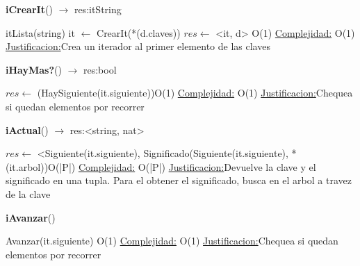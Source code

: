 \begin{Algoritmos}

\begin{algorithm}[H]{\textbf{iCrearIt}() $\to$ res:itString}
	\begin{algorithmic}[1]
		\State itLista(string) it $\gets$ CrearIt(*(d.claves))
		\State $res \gets$ <it, d> \Comment O(1)
		\medskip
		\Statex \underline{Complejidad:} O(1)
			\Statex \underline{Justificacion:}Crea un iterador al primer elemento de las claves
	\end{algorithmic}
\end{algorithm}


\begin{algorithm}[H]{\textbf{iHayMas?}() $\to$ res:bool}
	\begin{algorithmic}[1]
		\State $res \gets$ (HaySiguiente(it.siguiente))\Comment O(1)
		\medskip
		\Statex \underline{Complejidad:} O(1)
			\Statex \underline{Justificacion:}Chequea si quedan elementos por recorrer
	\end{algorithmic}
\end{algorithm}


\begin{algorithm}[H]{\textbf{iActual}() $\to$ res:<string, nat>}
	\begin{algorithmic}[1]
		\State $res \gets$ <Siguiente(it.siguiente), Significado(Siguiente(it.siguiente), *(it.arbol))\Comment O(|P|)
		\medskip
		\Statex \underline{Complejidad:} O(|P|)
			\Statex \underline{Justificacion:}Devuelve la clave y el significado en una tupla. Para el obtener el significado, busca en el arbol a travez de la clave
	\end{algorithmic}
\end{algorithm}

\begin{algorithm}[H]{\textbf{iAvanzar}()}
	\begin{algorithmic}[1]
		\State Avanzar(it.siguiente) \Comment O(1)
		\medskip
		\Statex \underline{Complejidad:} O(1)
			\Statex \underline{Justificacion:}Chequea si quedan elementos por recorrer
	\end{algorithmic}
\end{algorithm}


\end{Algoritmos}
